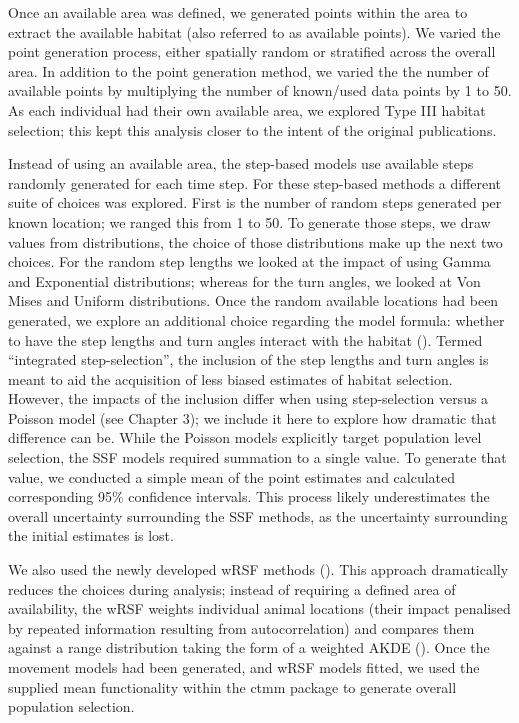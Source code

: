 \documentclass[10pt,a4paper]{article}
\begin{document}
Once an available area was defined, we generated points within the area to extract the available habitat (also referred to as available points).
We varied the point generation process, either spatially random or stratified across the overall area.
In addition to the point generation method, we varied the the number of available points by multiplying the number of known/used data points by 1 to 50.
As each individual had their own available area, we explored Type III habitat selection; this kept this analysis closer to the intent of the original publications.

Instead of using an available area, the step-based models use available steps randomly generated for each time step.
For these step-based methods a different suite of choices was explored.
First is the number of random steps generated per known location; we ranged this from 1 to 50.
To generate those steps, we draw values from distributions, the choice of those distributions make up the next two choices.
For the random step lengths we looked at the impact of using Gamma and Exponential distributions; whereas for the turn angles, we looked at Von Mises and Uniform distributions.
Once the random available locations had been generated, we explore an additional choice regarding the model formula: whether to have the step lengths and turn angles interact with the habitat ().
Termed ``integrated step-selection'', the inclusion of the step lengths and turn angles is meant to aid the acquisition of less biased estimates of habitat selection.
However, the impacts of the inclusion differ when using step-selection versus a Poisson model (see Chapter 3); we include it here to explore how dramatic that difference can be.
While the Poisson models explicitly target population level selection, the SSF models required summation to a single value.
To generate that value, we conducted a simple mean of the point estimates and calculated corresponding 95\% confidence intervals.
This process likely underestimates the overall uncertainty surrounding the SSF methods, as the uncertainty surrounding the initial estimates is lost.

We also used the newly developed wRSF methods ().
This approach dramatically reduces the choices during analysis; instead of requiring a defined area of availability, the wRSF weights individual animal locations (their impact penalised by repeated information resulting from autocorrelation) and compares them against a range distribution taking the form of a weighted AKDE ().
Once the movement models had been generated, and wRSF models fitted, we used the supplied mean functionality within the ctmm package to generate overall population selection.
\end{document}
